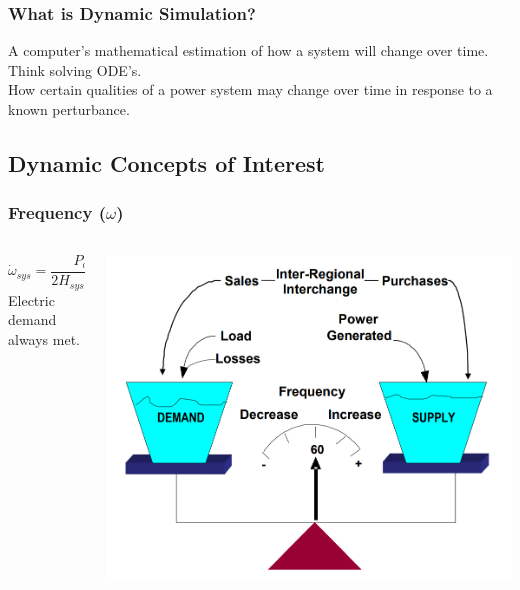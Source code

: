 \documentclass[14pt, unknownkeysallowed]{beamer}
\begin{document}
\begin{frame}
\frametitle{What is Dynamic Simulation?}
A computer's mathematical estimation of how a system will change over time.\\%
\vspace{1em}
Think solving ODE's.\\
\vspace{1em}
How certain qualities of a power system may change over time in response to a known perturbance.
\end{frame}
\subsection{Dynamic Concepts of Interest}
\begin{frame}
\frametitle{Frequency ($\omega$)}
\begin{columns}
\begin{column}{0.4\textwidth}
\[ \dot{\omega}_{sys} = \dfrac{P_{acc, sys}}{2H_{sys}\omega_{sys}(t) } \]
Electric demand always met.
\end{column}
\begin{column}{0.7\textwidth}
    \begin{center}
     \includegraphics[width=\linewidth]{freqScale} %
     \end{center}
\end{column}
\end{columns}
\end{frame}
\end{document}
